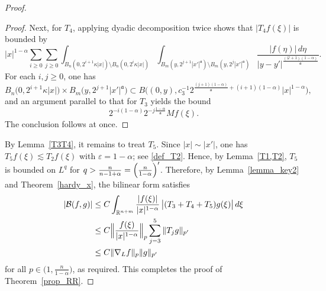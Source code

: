 \documentclass[12pt]{amsart}
\begin{document}
\begin{proof}
\begin{proof}
Next, for $T_4$, applying dyadic decomposition twice shows that $|T_4 f(\xi)|$ is bounded by
\begin{equation*}
    |x|^{1-\alpha} \sum_{i\ge 0} \sum_{j\ge 0} \int_{B_n(0,2^{i+1}\kappa |x|) \setminus B_n(0, 2^i \kappa |x|)} \int_{B_m(y,2^{j+1}|x'|^{\mathfrak a}) \setminus B_m(y, 2^j |x'|^{\mathfrak a})} \frac{|f(\eta)|\,d\eta}{|y-y'|^{\frac{(\mathcal{Q}+1)(1-\alpha)}{\mathfrak a}}}.
\end{equation*}
For each $i,j\ge 0$, one has
\begin{equation*}
    B_n\bigl(0,2^{i+1}\kappa |x|\bigr) \times B_m\bigl(y,2^{j+1}|x'|^{\mathfrak a}\bigr)  \subset B \bigl( (0,y), c_3^{-1} 2^{\frac{(j+1)(1-\alpha)}{\mathfrak a} + (i+1)(1-\alpha)} |x|^{1-\alpha} \bigr),
\end{equation*}
and an argument parallel to that for $T_3$ yields the bound
\begin{equation*}
    2^{-i(1-\alpha)} 2^{-j \frac{1-\alpha}{\mathfrak a}} Mf(\xi).
\end{equation*}
The conclusion follows at once.
\end{proof}

By Lemma~\ref{T3T4}, it remains to treat $T_5$. Since $|x|\sim |x'|$, one has $T_5 f(\xi) \lesssim T_2f(\xi)$ with $\varepsilon = 1-\alpha$; see \eqref{def_T2}. Hence, by Lemma~\ref{T1,T2}, $T_5$ is bounded on $L^q$ for $q> \frac{n}{n-1+\alpha} = \Bigl(\frac{n}{1-\alpha}\Bigr)'$. Therefore, by Lemma~\ref{lemma_key2} and Theorem~\ref{hardy_x}, the bilinear form satisfies
\begin{align}\label{eq_final}
    |\mathcal{B}(f,g)|
    &\le C \int_{\mathbb{R}^{n+m}} \frac{|f(\xi)|}{|x|^{1-\alpha}} \, \bigl|(T_3+ T_4 + T_5)g(\xi)\bigr| \, d\xi \nonumber\\
    &\le C \Bigl\| \frac{f(\xi)}{|x|^{1-\alpha}} \Bigr\|_p \sum_{j=3}^5 \|T_j g\|_{p'} \nonumber\\
    &\le C \| \nabla_L f\|_p \|g\|_{p'}
\end{align}
for all $p\in \bigl(1,\frac{n}{1-\alpha}\bigr)$, as required. This completes the proof of Theorem~\ref{prop_RR}.
\end{proof}
\end{document}

